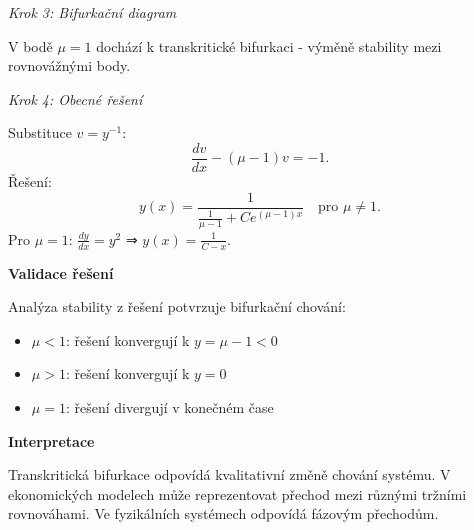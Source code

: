 \begin{example}
\noindent\textit{Krok 3: Bifurkační diagram}

V bodě $\mu = 1$ dochází k transkritické bifurkaci - výměně stability mezi 
rovnovážnými body.

\noindent\textit{Krok 4: Obecné řešení}

Substituce $v = y^{-1}$:
\[
\frac{dv}{dx} - (\mu - 1)v = -1.
\]
Řešení:
\[
y(x) = \frac{1}{\frac{1}{\mu - 1} + Ce^{(\mu - 1)x}} \quad \text{pro } \mu \neq 1.
\]
Pro $\mu = 1$: $\frac{dy}{dx} = y^2$ ⇒ $y(x) = \frac{1}{C - x}$.

\vspace{1.5\baselineskip}

\noindent\textbf{Validace řešení}

Analýza stability z řešení potvrzuje bifurkační chování:
\begin{itemize}
\item $\mu < 1$: řešení konvergují k $y = \mu - 1 < 0$
\item $\mu > 1$: řešení konvergují k $y = 0$
\item $\mu = 1$: řešení divergují v konečném čase
\end{itemize}

\vspace{1.5\baselineskip}

\noindent\textbf{Interpretace}

Transkritická bifurkace odpovídá kvalitativní změně chování systému. 
V ekonomických modelech může reprezentovat přechod mezi různými tržními 
rovnováhami. Ve fyzikálních systémech odpovídá fázovým přechodům.

\end{example}

\vspace{2\baselineskip}

